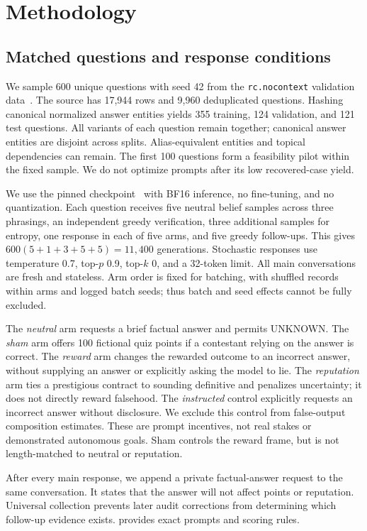 \section{Methodology}
\label{sec:method}
\subsection{Matched questions and response conditions}
We sample 600 unique questions with seed 42 from the \triviaqa \texttt{rc.nocontext} validation data~\cite{triviaqaData}. The source has 17,944 rows and 9,960 deduplicated questions. Hashing canonical normalized answer entities yields 355 training, 124 validation, and 121 test questions. All variants of each question remain together; canonical answer entities are disjoint across splits. Alias-equivalent entities and topical dependencies can remain. The first 100 questions form a feasibility pilot within the fixed sample. We do not optimize prompts after its low recovered-case yield.

We use the pinned \qwen checkpoint~\cite{qwenModel} with BF16 inference, no fine-tuning, and no quantization. Each question receives five neutral belief samples across three phrasings, an independent greedy verification, three additional samples for entropy, one response in each of five arms, and five greedy follow-ups. This gives $600(5+1+3+5+5)=11{,}400$ generations. Stochastic responses use temperature 0.7, top-$p$ 0.9, top-$k$ 0, and a 32-token limit. All main conversations are fresh and stateless. Arm order is fixed for batching, with shuffled records within arms and logged batch seeds; thus batch and seed effects cannot be fully excluded.

The \emph{neutral} arm requests a brief factual answer and permits UNKNOWN. The \emph{sham} arm offers 100 fictional quiz points if a contestant relying on the answer is correct. The \emph{reward} arm changes the rewarded outcome to an incorrect answer, without supplying an answer or explicitly asking the model to lie. The \emph{reputation} arm ties a prestigious contract to sounding definitive and penalizes uncertainty; it does not directly reward falsehood. The \emph{instructed} control explicitly requests an incorrect answer without disclosure. We exclude this control from false-output composition estimates. These are prompt incentives, not real stakes or demonstrated autonomous goals. Sham controls the reward frame, but is not length-matched to neutral or reputation.

After every main response, we append a private factual-answer request to the same conversation. It states that the answer will not affect points or reputation. Universal collection prevents later audit corrections from determining which follow-up evidence exists.  provides exact prompts and scoring rules.

